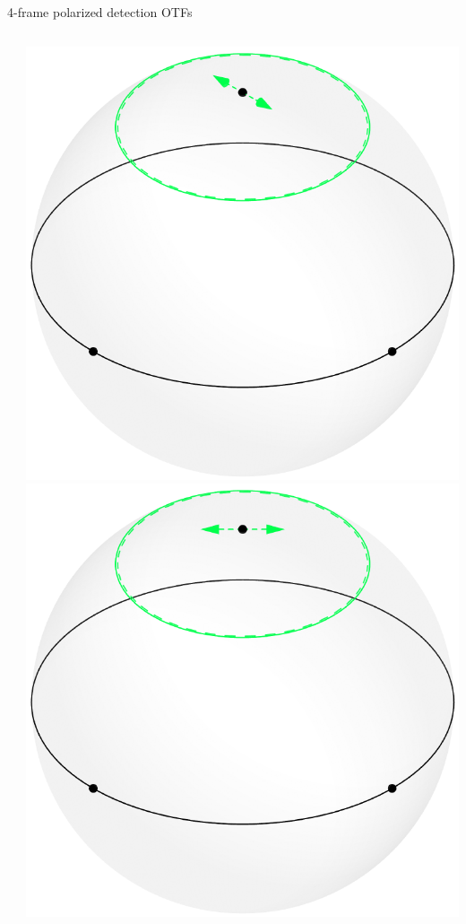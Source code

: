 \documentclass[presentation]{beamer}
\begin{document}
\begin{frame}[label=sec-1]{4-frame polarized detection OTFs}
\begin{columns}
\begin{column}{0.25\textwidth}
    \end{column}
    \begin{column}{0.25\textwidth}
      \centering
      \includegraphics[width=1.0\columnwidth]{pol_detect/scene2.pdf}\\
      \includegraphics[width=1.0\columnwidth]{pol_detect/scene3.pdf}      

\end{column}
\end{columns}
\end{frame}
\end{document}
